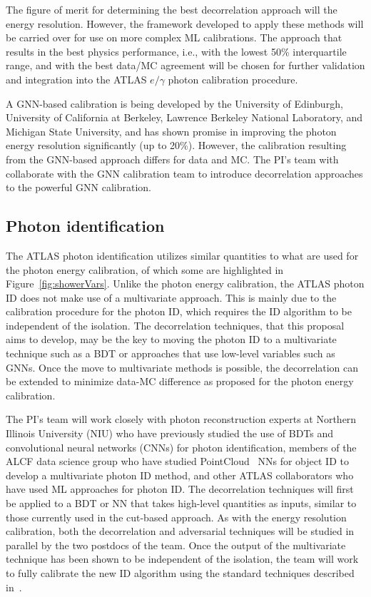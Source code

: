 \documentclass[letter, USenglish, 11pt, subfigure]{article}
\begin{document}

The figure of merit for determining the best decorrelation approach will the energy resolution. However, the framework developed to apply these methods will be carried over for use on more complex ML calibrations. The approach that results in the best physics performance, i.e., with the lowest 50\% interquartile range, and with the best data/MC agreement will be chosen for further validation and integration into the ATLAS $e/\gamma$ photon calibration procedure.


A GNN-based calibration is being developed by the University of Edinburgh, University of California at Berkeley, Lawrence Berkeley National Laboratory, and Michigan State University, and has shown promise in improving the photon energy resolution significantly (up to 20\%). However, the calibration resulting from the GNN-based approach differs for data and MC. The PI's team with collaborate with the GNN calibration team to introduce decorrelation approaches to the powerful GNN calibration.

\subsection{Photon identification}

The ATLAS photon identification utilizes similar quantities to what are used for the photon energy calibration, of which some are highlighted in Figure~\ref{fig:showerVars}. Unlike the photon energy calibration, the ATLAS photon ID does not make use of a multivariate approach. This is mainly due to the calibration procedure for the photon ID, which requires the ID algorithm to be independent of the isolation. The decorrelation techniques, that this proposal aims to develop, may be the key to moving the photon ID to a multivariate technique such as a BDT or approaches that use low-level variables such as GNNs. Once the move to multivariate methods is possible, the decorrelation can be extended to minimize data-MC difference as proposed for the photon energy calibration.

The PI's team will work closely with photon reconstruction experts at Northern Illinois University (NIU) who have previously studied the use of BDTs and convolutional neural networks (CNNs) for photon identification, members of the ALCF data science group who have studied PointCloud~\cite{ATL-PHYS-PUB-2021-002} NNs for object ID to develop a multivariate photon ID method, and other ATLAS collaborators who have used ML approaches for photon ID. The decorrelation techniques will first be applied to a BDT or NN that takes high-level quantities as inputs, similar to those currently used in the cut-based approach. As with the energy resolution calibration, both the decorrelation and adversarial techniques will be studied in parallel by the two postdocs of the team. Once the output of the multivariate technique has been shown to be independent of the isolation, the team will work to fully calibrate the new ID algorithm using the standard techniques described in~\cite{PERF-2013-04,PERF-2017-02}.
\end{document}
